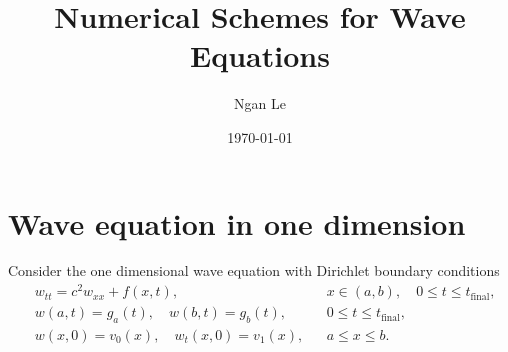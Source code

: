 \documentclass[11pt]{article}
\title{Numerical Schemes for Wave Equations}
\author{Ngan Le}
\date{\today}
\begin{document}
\maketitle

\section{Wave equation in one dimension}
Consider the one dimensional wave equation with Dirichlet boundary conditions
\begin{subequations}
\label{eq:1DWaveEquation}
\begin{align}
  &w_{tt} = c^2 w_{xx} + f(x,t), && x \in (a,b), \quad 0 \leq t \leq t_{\text{final}}, \\
  &w(a,t) = g_a(t), \quad w(b,t) = g_b(t), && 0 \leq t \leq t_{\text{final}}, \\
  &w(x,0) = v_0(x), \quad w_t(x,0) = v_1(x), && a \leq x \leq b.
\end{align}
\end{subequations}
\end{document}
